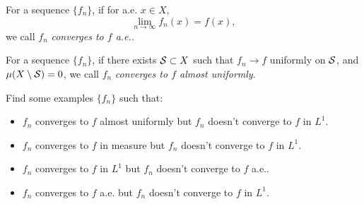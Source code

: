 \begin{defn}
    \label{Defn:ConvergeAlmostEverywhere}
    For a sequence $\{f_n\}$, if for a.e. $x\in X$, 
    \begin{displaymath}
        \lim_{n\rightarrow\infty}f_{n}(x)=f(x),
    \end{displaymath}
    we call $f_{n}$ \textit{converges to $f$ a.e..}
\end{defn}
\begin{defn}
    \label{Defn:AlmostConvergesUniformly}
    For a sequence $\{f_n\}$, if there exists $\mathcal{S}\subset X$ 
    such that 
    $f_{n}\rightarrow f$ uniformly on $\mathcal{S}$, 
    and $\mu(X\setminus\mathcal{S})=0$, 
    we call $f_{n}$ \textit{converges to $f$ almost uniformly}.
\end{defn}
\begin{exc}
    Find some examples $\{f_{n}\}$ such that: 
    \begin{itemize}
        \item $f_{n}$ converges to $f$ 
        almost uniformly but $f_{n}$ doesn't converge 
        to $f$ in $L^{1}$. 
        \item $f_{n}$ converges to $f$ in measure but 
        $f_{n}$ doesn't converge to $f$ in $L^{1}$.
        \item $f_{n}$ converges to $f$ in $L^{1}$ but 
        $f_{n}$ doesn't converge to $f$ a.e..
        \item $f_{n}$ converges to $f$ a.e. but 
        $f_{n}$ doesn't converge to $f$ in $L^{1}$.
    \end{itemize} 
\end{exc}
